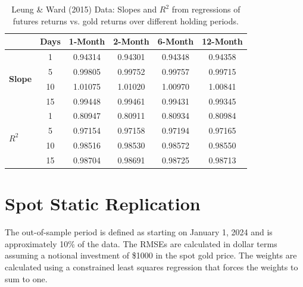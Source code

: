 \documentclass{article}
\begin{document}
\begin{table}[h!]
\centering
\begin{tabular}{lccccc}
\toprule
& \textbf{Days} & \textbf{1-Month} & \textbf{2-Month} & \textbf{6-Month} & \textbf{12-Month} \\
\midrule
\multirow{4}{*}{\textbf{Slope}} 
 & 1  & 0.94314 & 0.94301 & 0.94348 & 0.94358 \\
 & 5  & 0.99805 & 0.99752 & 0.99757 & 0.99715 \\
 & 10 & 1.01075 & 1.01020 & 1.00970 & 1.00841 \\
 & 15 & 0.99448 
& 0.99461 & 0.99431 & 0.99345 \\
\midrule
\multirow{4}{*}{\textbf{$R^2$}}   
 & 1  & 0.80947 
& 0.80911 & 0.80934 & 0.80984 \\
 & 5  & 0.97154 & 0.97158 & 0.97194 & 0.97165 \\
 & 10 & 0.98516 & 0.98530 & 0.98572 & 0.98550 \\
 & 15 & 0.98704 & 0.98691 & 0.98725 & 0.98713 \\
\bottomrule
\end{tabular}
\caption{Leung \& Ward (2015) Data: Slopes and $R^2$ from regressions of futures returns vs. gold returns over different holding periods.}
\label{tab:leung_ward_slopes_r2}
\end{table}

\clearpage
\section{Spot Static Replication}

The out-of-sample period is defined as starting on January 1, 2024 and is approximately 10\% of the data.
The RMSEs are calculated in dollar terms assuming a notional investment of \$1000 in the spot gold price.
The weights are calculated using a constrained least squares regression that forces the weights to sum to one.
\end{document}
